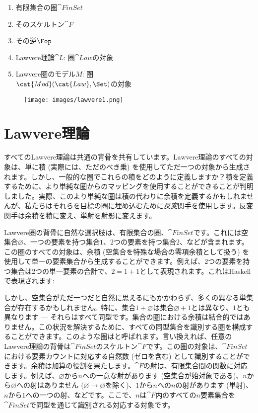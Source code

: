 \begin{enumerate}
  \tightlist
  \item
        有限集合の圏$\cat{FinSet}$
  \item
        そのスケルトン$\cat{F}$
  \item
        その逆$\Fop$
  \item
        Lawvere理論$\cat{L}$: 圏$\cat{Law}$の対象
  \item
        Lawvere圏のモデル$M$: 圏\\
        $\cat{Mod}(\cat{Law}, \Set)$の対象
\end{enumerate}

\begin{figure}[H]
  \centering
  \texttt{[image: images/lawvere1.png]}
\end{figure}

\section{Lawvere理論}

すべてのLawvere理論は共通の背骨を共有しています。Lawvere理論のすべての対象は、単に積 (実際には、ただのべき乗) を使用してただ一つの対象から生成されます。しかし、一般的な圏でこれらの積をどのように定義しますか？積を定義するために、より単純な圏からのマッピングを使用することができることが判明しました。実際、このより単純な圏は積の代わりに余積を定義するかもしれませんが、私たちはそれらを目標の圏に埋め込むために\emph{反変}関手を使用します。反変関手は余積を積に変え、単射を射影に変えます。

Lawvere圏の背骨に自然な選択肢は、有限集合の圏、$\cat{FinSet}$です。これには空集合$\varnothing$、一つの要素を持つ集合$1$、2つの要素を持つ集合$2$、などが含まれます。この圏のすべての対象は、余積 (空集合を特殊な場合の零項余積として扱う) を使用して単一の要素集合から生成することができます。例えば、2つの要素を持つ集合は2つの単一要素の合計で、$2 = 1 + 1$として表現されます。これはHaskellで表現されます: 

しかし、空集合がただ一つだと自然に思えるにもかかわらず、多くの異なる単集合が存在するかもしれません。特に、集合$1 + \varnothing$は集合$\varnothing + 1$とは異なり、$1$とも異なります --- それらはすべて同型です。集合の圏における余積は結合的ではありません。この状況を解決するために、すべての同型集合を識別する圏を構成することができます。このような圏はと呼ばれます。言い換えれば、任意のLawvere理論の背骨は$\cat{FinSet}$のスケルトン$\cat{F}$です。この圏の対象は、$\cat{FinSet}$における要素カウントに対応する自然数 (ゼロを含む) として識別することができます。余積は加算の役割を果たします。$\cat{F}$の射は、有限集合間の関数に対応します。例えば、$\varnothing$から$n$への一意な射があります (空集合が始対象である)、$n$から$\varnothing$への射はありません ($\varnothing \to \varnothing$を除く)、$1$から$n$への$n$の射があります (単射)、$n$から$1$への一つの射、などです。ここで、$n$は$\cat{F}$内のすべての$n$要素集合を$\cat{FinSet}$で同型を通じて識別される対応する対象です。

